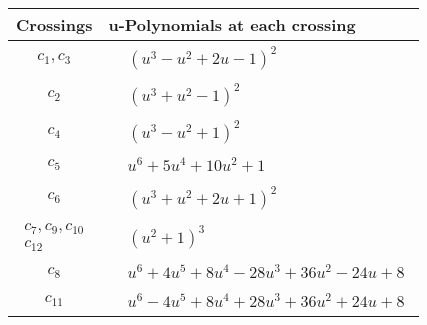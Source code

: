 \documentclass[1p]{elsarticle_modified}
\theoremstyle{definition}
\begin{document}
\begin{tabular}{m{50pt}|m{274pt}}
Crossings & \hspace{64pt}u-Polynomials at each crossing \\
\hline $$\begin{aligned}c_{1},c_{3}\end{aligned}$$&$\begin{aligned}
&(u^3- u^2+2 u-1)^2
\end{aligned}$\\
\hline $$\begin{aligned}c_{2}\end{aligned}$$&$\begin{aligned}
&(u^3+u^2-1)^2
\end{aligned}$\\
\hline $$\begin{aligned}c_{4}\end{aligned}$$&$\begin{aligned}
&(u^3- u^2+1)^2
\end{aligned}$\\
\hline $$\begin{aligned}c_{5}\end{aligned}$$&$\begin{aligned}
&u^6+5 u^4+10 u^2+1
\end{aligned}$\\
\hline $$\begin{aligned}c_{6}\end{aligned}$$&$\begin{aligned}
&(u^3+u^2+2 u+1)^2
\end{aligned}$\\
\hline $$\begin{aligned}c_{7},c_{9},c_{10}\\c_{12}\end{aligned}$$&$\begin{aligned}
&(u^2+1)^3
\end{aligned}$\\
\hline $$\begin{aligned}c_{8}\end{aligned}$$&$\begin{aligned}
&u^6+4 u^5+8 u^4-28 u^3+36 u^2-24 u+8
\end{aligned}$\\
\hline $$\begin{aligned}c_{11}\end{aligned}$$&$\begin{aligned}
&u^6-4 u^5+8 u^4+28 u^3+36 u^2+24 u+8
\end{aligned}$\\
\hline
\end{tabular}\\~\\
\end{document}
